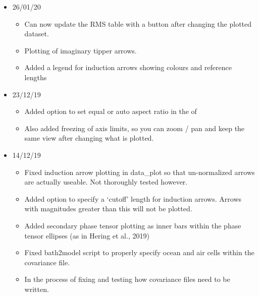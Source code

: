 \documentclass[letterpaper,10pt,english]{sphinxmanual}
\begin{document}
\begin{itemize}
\begin{itemize}
\end{itemize}

\item {} 
26/01/20
\begin{itemize}
\item {} 
Can now update the RMS table with a button after changing the plotted dataset.

\item {} 
Plotting of imaginary tipper arrows.

\item {} 
Added a legend for induction arrows showing colours and reference lengths

\end{itemize}

\item {} 
23/12/19
\begin{itemize}
\item {} 
Added option to set equal or auto aspect ratio in the {\hyperref[\detokenize{content/data_plot/map_viewer:map-window}]{}} of {\hyperref[\detokenize{content/data_plot/main_window:data-plot}]{}}

\item {} 
Also added freezing of axis limits, so you can zoom / pan and keep the same view after changing what is plotted.

\end{itemize}

\item {} 
14/12/19
\begin{itemize}
\item {} 
Fixed induction arrow plotting in data\_plot so that un-normalized arrows are actually useable. Not thoroughly tested however.

\item {} 
Added option to specify a ‘cutoff’ length for induction arrows. Arrows with magnitudes greater than this will not be plotted.

\item {} 
Added secondary phase tensor plotting as inner bars within the phase tensor ellipses (as in Hering et al., 2019)

\item {} 
Fixed bath2model script to properly specify ocean and air cells within the covariance file.

\item {} 
In the process of fixing and testing how covariance files need to be written.


\end{itemize}
\end{itemize}
\end{document}
